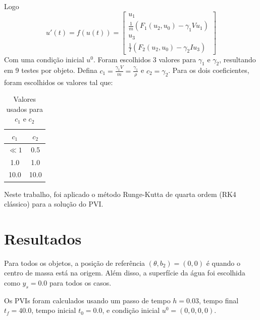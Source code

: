 \documentclass[
	12pt,				%
	oneside,			%
	a4paper,			%
	]{article}
\begin{document}
    Logo
    \[
        u'(t) = f(u(t)) = \begin{bmatrix}
            u_1 \\
            \frac{1}{m} (F_1(u_2, u_0) - \gamma_1 V u_1) \\
            u_3 \\
            \frac{1}{I}(F_2(u_2, u_0) - \gamma_2 I u_3)
        \end{bmatrix}
    \]
    Com uma condição inicial $u^0$. Foram escolhidos 3 valores para $\gamma_1$ e $\gamma_2$, resultando em 9 testes por objeto. Defina $c_1 = \frac{\gamma_1 V}{m} = \frac{\gamma_1}{\rho}$ e $c_2 = \gamma_2$. Para os dois coeficientes, foram escolhidos os valores tal que:
    \begin{table}[H]
        \centering
        \begin{tabular}{c|c}
            $c_1$ & $c_2$ \\
            \hline
            $\ll 1$ & 0.5 \\
            1.0 & 1.0 \\
            10.0 & 10.0 
        \end{tabular}
        \caption{Valores usados para $c_1$ e $c_2$}
    \end{table}

    Neste trabalho, foi aplicado o método Runge-Kutta de quarta ordem (RK4 clássico) para a solução do PVI.













    \section{Resultados}
    Para todos os objetos, a posição de referência $(\theta, b_2) = (0,0)$ é quando o centro de massa está na origem. Além disso, a superfície da água foi escolhida como $y_s = 0.0$ para todos os casos.

    Os PVIs foram calculados usando um passo de tempo $h = 0.03$, tempo final $t_f = 40.0$, tempo inicial $t_0 = 0.0$, e condição inicial $u^0 = (0,0,0,0)$.
\end{document}
